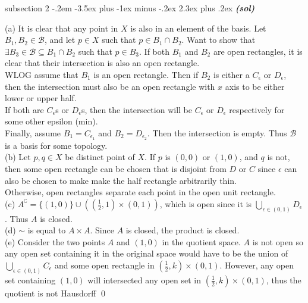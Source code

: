 \documentclass[12pt]{article}
\makeatletter
\newenvironment{s}{\@startsection
       {subsection}
       {2}
       {-.2em}
       {-3.5ex plus -1ex minus -.2ex}
       {2.3ex plus .2ex}
       {\pagebreak[3]%
       \large\bf\noindent\emph{(sol) }
       }
       }
\makeatother
\begin{document}
\begin{s}{3.17}
    (a) It is clear that any point in $X$ is also in an element of the basis.
    Let $B_1, B_2 \in \mathscr{B}$, and let $p\in X$ such that $p \in B_1 \cap B_2$. Want to show that 
    $\exists B_3 \in \mathscr{B} \subseteq B_1 \cap B_2$ such that $p\in B_3$.
    If both $B_1$ and $B_2$ are open rectangles, it is clear that their intersection is also an open rectangle.\\
    WLOG assume that $B_1$ is an open rectangle. Then if $B_2$ is either a $C_\epsilon$ or $D_\epsilon$, then 
    the intersection must also be an open rectangle with $x$ axis to be either lower or upper half.\\
    If both are $C_\epsilon$s or $D_\epsilon$s, then the intersection will be $C_\epsilon$ or $D_\epsilon$ respectively
    for some other epsilon (min). \\
    Finally, assume $B_1=C_{\epsilon_1}$ and $B_2=D_{\epsilon_2}$. Then the intersection is empty. 
    Thus $\mathscr{B}$ is a basis for some topology.\\
    (b) Let $p,q \in X$ be distinct point of $X$. 
    If $p$ is $(0,0)$ or $(1,0)$, and $q$ is not, then some open rectangle can be chosen that is disjoint from $D$ or $C$
    since $\epsilon$ can also be chosen to make make the half rectangle arbitrarily thin.\\
    Otherwise, open rectangles separate each point in the open unit rectangle.\\
    (c) $A^\complement = \{(1,0)\} \cup ((\frac{1}{2},1)\times (0,1))$, which is open since it is 
    $\bigcup_{\epsilon \in (0,1)} D_\epsilon$. Thus $A$ is closed. \\
    (d) $\sim$ is equal to $A\times A$. Since $A$ is closed, the product is closed.\\
    (e) Consider the two points $A$ and $(1,0)$ in the quotient space. $A$ is not open so any open set containing it
    in the original space would have to be the union of $\bigcup_{\epsilon \in (0,1)} C_\epsilon$
    and some open rectangle in $(\frac{1}{2},k)\times (0,1)$. However, any open set containing $(1,0)$ will intersected
    any open set in $(\frac{1}{2},k)\times (0,1)$, thus the quotient is not Hausdorff
    \qed
\end{s}
\end{document}
